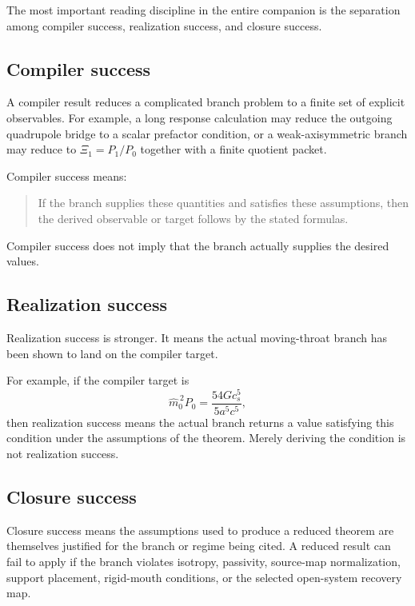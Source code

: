 The most important reading discipline in the entire companion is the separation among compiler success, realization success, and closure success.

\subsection{Compiler success}
\label{subsec:compiler-success}

A compiler result reduces a complicated branch problem to a finite set of explicit observables.  For example, a long response calculation may reduce the outgoing quadrupole bridge to a scalar prefactor condition, or a weak-axisymmetric branch may reduce to \(\Xi_1=P_1/P_0\) together with a finite quotient packet.

Compiler success means:
\begin{quote}
If the branch supplies these quantities and satisfies these assumptions, then the derived observable or target follows by the stated formulas.
\end{quote}

Compiler success does not imply that the branch actually supplies the desired values.

\subsection{Realization success}
\label{subsec:realization-success}

Realization success is stronger.  It means the actual moving-throat branch has been shown to land on the compiler target.

For example, if the compiler target is
\[
\widehat m_0^{\,2}P_0
=
\frac{54G c_s^5}{5a^5c^5},
\]
then realization success means the actual branch returns a value satisfying this condition under the assumptions of the theorem.  Merely deriving the condition is not realization success.

\subsection{Closure success}
\label{subsec:closure-success}

Closure success means the assumptions used to produce a reduced theorem are themselves justified for the branch or regime being cited.  A reduced result can fail to apply if the branch violates isotropy, passivity, source-map normalization, support placement, rigid-mouth conditions, or the selected open-system recovery map.

